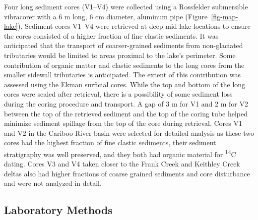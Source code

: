 \documentclass[
  letterpaper,
  DIV=11,
  numbers=noendperiod]{scrartcl}
\begin{document}
Four long sediment cores (V1--V4) were collected using a Rossfelder
submersible vibracorer with a 6 m long, 6 cm diameter, aluminum pipe
(Figure~\ref{fig-map-lake}). Sediment cores V1--V4 were retrieved at
deep mid-lake locations to ensure the cores consisted of a higher
fraction of fine clastic sediments. It was anticipated that the
transport of coarser-grained sediments from non-glaciated tributaries
would be limited to areas proximal to the lake's perimeter. Some
contribution of organic matter and clastic sediments to the long cores
from the smaller sidewall tributaries is anticipated. The extent of this
contribution was assessed using the Ekman surficial cores. While the top
and bottom of the long cores were sealed after retrieval, there is a
possibility of some sediment loss during the coring procedure and
transport. A gap of 3 m for V1 and 2 m for V2 between the top of the
retrieved sediment and the top of the coring tube helped minimize
sediment spillage from the top of the core during retrieval. Cores V1
and V2 in the Cariboo River basin were selected for detailed analysis as
these two cores had the highest fraction of fine clastic sediments,
their sediment stratigraphy was well preserved, and they both had
organic material for \textsuperscript{14}C dating. Cores V3 and V4 taken
closer to the Frank Creek and Keithley Creek deltas also had higher
fractions of coarse grained sediments and core disturbance and were not
analyzed in detail.

\hypertarget{laboratory-methods}{%
\subsection{Laboratory Methods}\label{laboratory-methods}}
\end{document}
